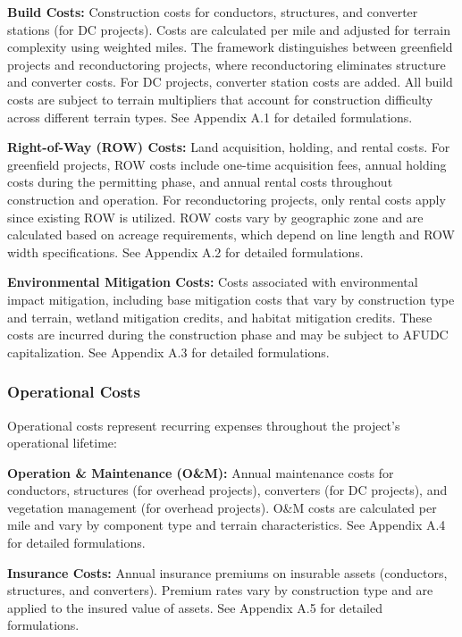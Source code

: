 \documentclass[11pt,twocolumn,a4paper]{article}
\begin{document}
\textbf{Build Costs:} Construction costs for conductors, structures, and converter stations (for DC projects). Costs are calculated per mile and adjusted for terrain complexity using weighted miles. The framework distinguishes between greenfield projects and reconductoring projects, where reconductoring eliminates structure and converter costs. For DC projects, converter station costs are added. All build costs are subject to terrain multipliers that account for construction difficulty across different terrain types. See Appendix A.1 for detailed formulations.

\textbf{Right-of-Way (ROW) Costs:} Land acquisition, holding, and rental costs. For greenfield projects, ROW costs include one-time acquisition fees, annual holding costs during the permitting phase, and annual rental costs throughout construction and operation. For reconductoring projects, only rental costs apply since existing ROW is utilized. ROW costs vary by geographic zone and are calculated based on acreage requirements, which depend on line length and ROW width specifications. See Appendix A.2 for detailed formulations.

\textbf{Environmental Mitigation Costs:} Costs associated with environmental impact mitigation, including base mitigation costs that vary by construction type and terrain, wetland mitigation credits, and habitat mitigation credits. These costs are incurred during the construction phase and may be subject to AFUDC capitalization. See Appendix A.3 for detailed formulations.



\subsubsection{Operational Costs}

Operational costs represent recurring expenses throughout the project's operational lifetime:

\textbf{Operation \& Maintenance (O\&M):} Annual maintenance costs for conductors, structures (for overhead projects), converters (for DC projects), and vegetation management (for overhead projects). O\&M costs are calculated per mile and vary by component type and terrain characteristics. See Appendix A.4 for detailed formulations.

\textbf{Insurance Costs:} Annual insurance premiums on insurable assets (conductors, structures, and converters). Premium rates vary by construction type and are applied to the insured value of assets. See Appendix A.5 for detailed formulations.
\end{document}
